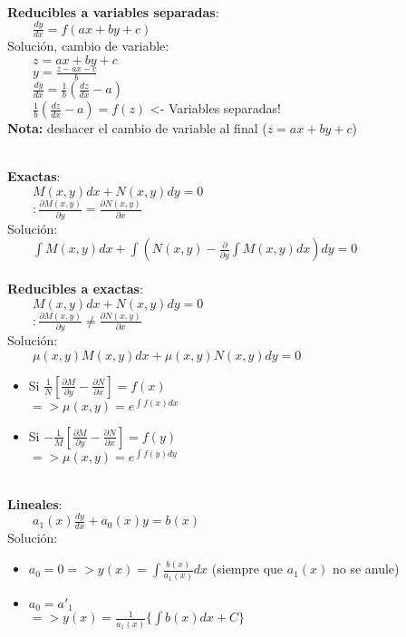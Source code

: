 \documentclass[a4paper,landscape,10pt]{cheatsheet}
\begin{document}
\hfill\\
\textbf{Reducibles a variables separadas}:\\
$\qquad \frac{dy}{dx}=f(ax+by+c)$\\
Solución, cambio de variable:\\
$\qquad z=ax+by+c$\\
$\qquad y=\frac{z-ax-c}{b}$\\
$\qquad \frac{dy}{dx}=\frac{1}{b}\left(\frac{dz}{dx}-a\right)$\\
$\qquad \frac{1}{b}\left(\frac{dz}{dx}-a\right)=f(z)$  <- Variables separadas!\\
\qquad\textbf{Nota:} deshacer el cambio de variable al final ($z=ax+by+c$)


\hfill\\
\textbf{Exactas}:\\
$\qquad M(x,y)dx+N(x,y)dy=0$\\
$\qquad :\frac{\partial M(x,y)}{\partial y}=\frac{\partial N(x,y)}{\partial x}$\\
Solución:\\
$\qquad \int M(x,y)dx + \int\left(N(x,y)-\frac{\partial}{\partial y}\int M(x,y)dx\right)dy = 0$\\

\hfill\\
\textbf{Reducibles a exactas}:\\
$\qquad M(x,y)dx+N(x,y)dy=0$\\
$\qquad :\frac{\partial M(x,y)}{\partial y}\neq\frac{\partial N(x,y)}{\partial x}$\\
Solución:\\
$\qquad \mu(x,y)M(x,y)dx+\mu(x,y)N(x,y)dy=0$\\
\begin{itemize}
  \item Si $\frac{1}{N}\left[\frac{\partial M}{\partial y}-\frac{\partial N}{\partial x}\right]=f(x)$\\
        $=> \mu(x,y)=e^{\int f(x)dx}$
  \item Si $-\frac{1}{M}\left[\frac{\partial M}{\partial y}-\frac{\partial N}{\partial x}\right]=f(y)$\\
        $=> \mu(x,y)=e^{\int f(y)dy}$
\end{itemize}

\hfill\\
\textbf{Lineales}:\\
$\qquad a_1(x)\frac{dy}{dx}+a_0(x)y=b(x)$\\
Solución:\\
\begin{itemize}
  \item $a_0=0 => y(x)=\int\frac{b(x)}{a_1(x)}dx$ (siempre que $a_1(x)$ no se anule)\\
  \item $a_0=a'_1 $\\$=> y(x)=\frac{1}{a_1(x)}\{\int b(x)dx+C\}$\\
\end{itemize}
\end{document}
